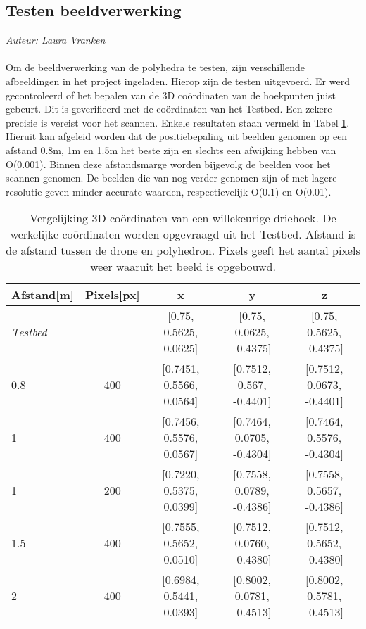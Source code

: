 \subsection{Testen beeldverwerking}
{\em Auteur: Laura Vranken}
\noindent
\\\\
Om de beeldverwerking van de polyhedra te testen, zijn verschillende afbeeldingen in het project ingeladen. Hierop zijn de testen uitgevoerd. Er werd gecontroleerd of het bepalen van de 3D co\"ordinaten van de hoekpunten juist gebeurt. Dit is geverifieerd met de co\"ordinaten van het Testbed. Een zekere precisie is vereist voor het scannen. Enkele resultaten staan vermeld in Tabel \ref{table: 3Dcoord}. Hieruit kan afgeleid worden dat de positiebepaling uit beelden genomen op een afstand 0.8m, 1m en 1.5m het beste zijn en slechts een afwijking hebben van O(0.001). Binnen deze afstandsmarge worden bijgevolg de beelden voor het scannen genomen. De beelden die van nog verder genomen zijn of met lagere resolutie geven minder accurate waarden, respectievelijk O(0.1) en O(0.01).\\
\begin{table}[H]
	\centering
	\begin{tabular}{l|c|c|c|c}
    Afstand[m] & Pixels[px] & x & y & z\\ \hline
		\textit{Testbed} & &[0.75, 0.5625, 0.0625] &[0.75, 0.0625, -0.4375] & [0.75, 0.5625, -0.4375] \\
		 {0.8}  & 400 & [0.7451, 0.5566, 0.0564] & [0.7512, 0.567, -0.4401] & [0.7512, 0.0673, -0.4401]\\
		{1} & 400 &[0.7456, 0.5576, 0.0567] & [0.7464, 0.0705, -0.4304] & [0.7464, 0.5576, -0.4304]\\
        {1} & 200 & [0.7220, 0.5375, 0.0399] & [0.7558, 0.0789, -0.4386] & [0.7558, 0.5657, -0.4386]\\
		{1.5} & 400 & [0.7555, 0.5652, 0.0510] & [0.7512, 0.0760, -0.4380] & [0.7512, 0.5652, -0.4380] \\
        {2} & 400 & [0.6984, 0.5441, 0.0393] & [0.8002, 0.0781, -0.4513]& [0.8002, 0.5781, -0.4513]
	\end{tabular}
\caption{Vergelijking 3D-co\"ordinaten van een willekeurige driehoek. De werkelijke co\"ordinaten worden opgevraagd uit het Testbed. Afstand is de afstand tussen de drone en polyhedron. Pixels geeft het aantal pixels weer waaruit het beeld is opgebouwd.}
\label{table: 3Dcoord}
\end{table}